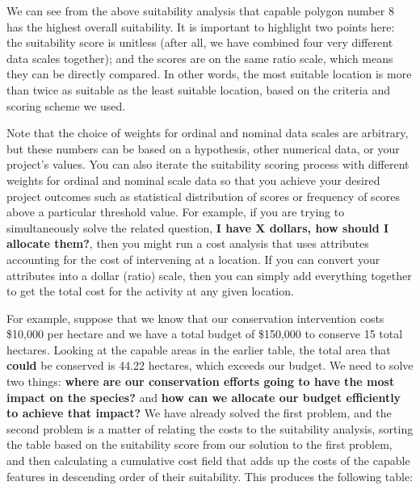 \documentclass[
]{book}
\begin{document}
We can see from the above suitability analysis that capable polygon number 8 has the highest overall suitability. It is important to highlight two points here: the suitability score is unitless (after all, we have combined four very different data scales together); and the scores are on the same ratio scale, which means they can be directly compared. In other words, the most suitable location is more than twice as suitable as the least suitable location, based on the criteria and scoring scheme we used.

Note that the choice of weights for ordinal and nominal data scales are arbitrary, but these numbers can be based on a hypothesis, other numerical data, or your project's values. You can also iterate the suitability scoring process with different weights for ordinal and nominal scale data so that you achieve your desired project outcomes such as statistical distribution of scores or frequency of scores above a particular threshold value. For example, if you are trying to simultaneously solve the related question, \textbf{I have X dollars, how should I allocate them?}, then you might run a cost analysis that uses attributes accounting for the cost of intervening at a location. If you can convert your attributes into a dollar (ratio) scale, then you can simply add everything together to get the total cost for the activity at any given location.

For example, suppose that we know that our conservation intervention costs \$10,000 per hectare and we have a total budget of \$150,000 to conserve 15 total hectares. Looking at the capable areas in the earlier table, the total area that \textbf{could} be conserved is 44.22 hectares, which exceeds our budget. We need to solve two things: \textbf{where are our conservation efforts going to have the most impact on the species?} and \textbf{how can we allocate our budget efficiently to achieve that impact?} We have already solved the first problem, and the second problem is a matter of relating the costs to the suitability analysis, sorting the table based on the suitability score from our solution to the first problem, and then calculating a cumulative cost field that adds up the costs of the capable features in descending order of their suitability. This produces the following table:
\end{document}
